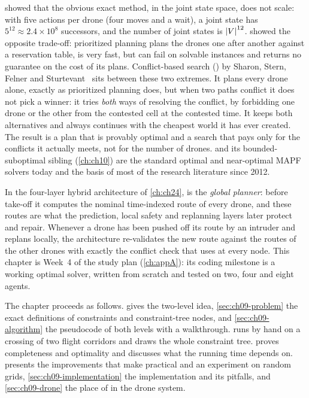  showed that the obvious exact method, \astar in the joint
state space, does not scale: with five actions per drone (four moves and a
wait), a joint state has $5^{12} \approx 2.4 \times 10^{8}$ successors, and
the number of joint states is $\left\lvert V \right\rvert^{12}$.  showed the
opposite trade-off: prioritized planning plans the drones one after another
against a reservation table, is very fast, but can fail on solvable instances
and returns no guarantee on the cost of its plans. Conflict-based search
(\cbs) by Sharon, Stern, Felner and
Sturtevant~\cite{sharon2012cbs,sharon2015cbs} sits between these two
extremes. It plans every drone alone, exactly as prioritized planning does,
but when two paths conflict it does not pick a winner: it tries \emph{both}
ways of resolving the conflict, by forbidding one drone or the other from the
contested cell at the contested time. It keeps both alternatives and
always continues with the cheapest world it has ever created. The result is a plan that is provably optimal and a
search that pays only for the conflicts it actually meets, not for the number
of drones. \cbs and its bounded-suboptimal sibling \ecbs (\cref{ch:ch10}) are
the standard optimal and near-optimal MAPF solvers today and the basis of most
of the research literature since 2012.

In the four-layer hybrid architecture of \cref{ch:ch24}, \cbs is the
\emph{global planner}: before take-off it computes the nominal
time-indexed route of every drone, and these routes are what the prediction,
local safety and replanning layers later protect and repair. Whenever a
drone has been pushed off its route by an intruder and replans locally, the
architecture re-validates the new route against the routes of the other
drones with exactly the conflict check that \cbs uses at every node. This
chapter is Week~4 of the study plan (\cref{ch:appA}): its coding milestone is
a working optimal \cbs solver, written from scratch and tested on two, four
and eight agents.

The chapter proceeds as follows.  gives the
two-level idea, \cref{sec:ch09-problem} the exact definitions of constraints
and constraint-tree nodes, and \cref{sec:ch09-algorithm} the pseudocode of
both levels with a walkthrough.  runs \cbs by hand on
a crossing of two flight corridors and draws the whole constraint tree.
 proves completeness and optimality and discusses
what the running time depends on.  presents the
improvements that make \cbs practical and an experiment on random grids,
\cref{sec:ch09-implementation} the \python implementation and its pitfalls,
and \cref{sec:ch09-drone} the place of \cbs in the drone system.

